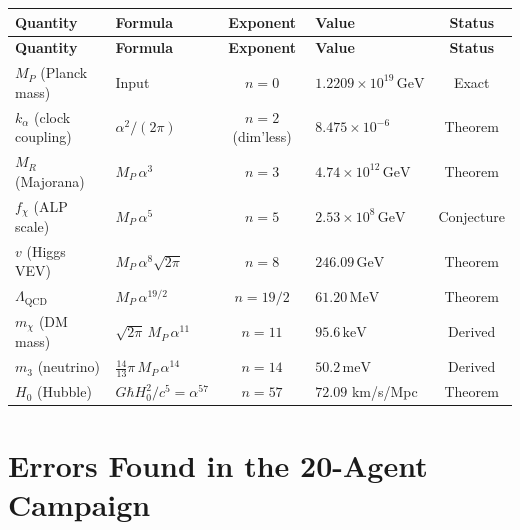 \documentclass[11pt]{article}
\newcommand{\MP}{M_P}
\newcommand{\GeV}{\,\mathrm{GeV}}
\newcommand{\MeV}{\,\mathrm{MeV}}
\newcommand{\keV}{\,\mathrm{keV}}
\newcommand{\meV}{\,\mathrm{meV}}
\begin{document}
\renewcommand{\arraystretch}{1.5}
\begin{longtable}{@{}p{2.5cm}p{4.5cm}cp{2.5cm}c@{}}
\toprule
\textbf{Quantity} & \textbf{Formula} & \textbf{Exponent} & \textbf{Value} & \textbf{Status} \\
\midrule
\endfirsthead
\toprule
\textbf{Quantity} & \textbf{Formula} & \textbf{Exponent} & \textbf{Value} & \textbf{Status} \\
\midrule
\endhead

$\MP$ (Planck mass)
  & Input
  & $n = 0$
  & $1.2209 \times 10^{19}\GeV$
  & Exact \\
\midrule

$k_\alpha$ (clock coupling)
  & $\alpha^2/(2\pi)$
  & $n = 2$ (dim'less)
  & $8.475 \times 10^{-6}$
  & Theorem \\
\midrule

$M_R$ (Majorana)
  & $\MP\,\alpha^3$
  & $n = 3$
  & $4.74 \times 10^{12}\GeV$
  & Theorem \\
\midrule

$f_\chi$ (ALP scale)
  & $\MP\,\alpha^5$
  & $n = 5$
  & $2.53 \times 10^{8}\GeV$
  & Conjecture \\
\midrule

$v$ (Higgs VEV)
  & $\MP\,\alpha^8\sqrt{2\pi}$
  & $n = 8$
  & $246.09\GeV$
  & Theorem \\
\midrule

$\Lambda_\mathrm{QCD}$
  & $\MP\,\alpha^{19/2}$
  & $n = 19/2$
  & $61.20\MeV$
  & Theorem \\
\midrule

$m_\chi$ (DM mass)
  & $\sqrt{2\pi}\,\MP\,\alpha^{11}$
  & $n = 11$
  & $95.6\keV$
  & Derived \\
\midrule

$m_3$ (neutrino)
  & $\frac{14}{13}\pi\,\MP\,\alpha^{14}$
  & $n = 14$
  & $50.2\meV$
  & Derived \\
\midrule

$H_0$ (Hubble)
  & $G\hbar H_0^2/c^5 = \alpha^{57}$
  & $n = 57$
  & $72.09$ km/s/Mpc
  & Theorem \\
\bottomrule
\end{longtable}

\section{Errors Found in the 20-Agent Campaign}
\end{document}
